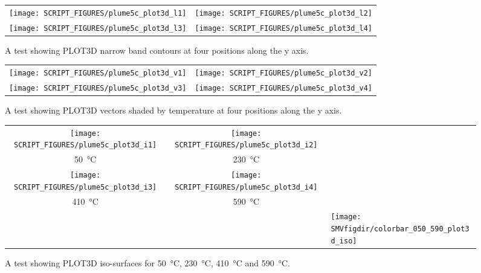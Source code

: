 \documentclass[11pt,twoside]{book}
\begin{document}
\begin{figure}[bph]
\begin{center}
\begin{tabular}{cc}
 \texttt{[image: SCRIPT\_FIGURES/plume5c\_plot3d\_l1]}&
 \texttt{[image: SCRIPT\_FIGURES/plume5c\_plot3d\_l2]}\\
 \texttt{[image: SCRIPT\_FIGURES/plume5c\_plot3d\_l3]}&
 \texttt{[image: SCRIPT\_FIGURES/plume5c\_plot3d\_l4]}\\
 \end{tabular}
\end{center}
 \caption{A test showing PLOT3D narrow band contours at four positions along the y axis.}
\label{figPLOT3Dtestline}%
\end{figure}

\begin{figure}[bph]
\begin{center}
\begin{tabular}{cc}
 \texttt{[image: SCRIPT\_FIGURES/plume5c\_plot3d\_v1]}&
 \texttt{[image: SCRIPT\_FIGURES/plume5c\_plot3d\_v2]}\\
 \texttt{[image: SCRIPT\_FIGURES/plume5c\_plot3d\_v3]}&
 \texttt{[image: SCRIPT\_FIGURES/plume5c\_plot3d\_v4]}\\
 \end{tabular}
\end{center}
 \caption{A test showing PLOT3D vectors shaded by temperature at four positions
 along the y axis.}
\label{figPLOT3Dtestvector}%
\end{figure}

\begin{figure}[bph]
\begin{center}
\begin{tabular}{ccl}
 \texttt{[image: SCRIPT\_FIGURES/plume5c\_plot3d\_i1]}&
 \texttt{[image: SCRIPT\_FIGURES/plume5c\_plot3d\_i2]}\\
 \SI{50}{\degreeCelsius}&\SI{230}{\degreeCelsius}\\
  \texttt{[image: SCRIPT\_FIGURES/plume5c\_plot3d\_i3]}&
 \texttt{[image: SCRIPT\_FIGURES/plume5c\_plot3d\_i4]}\\
 \SI{410}{\degreeCelsius}&\SI{590}{\degreeCelsius}\\
&&\raisebox{0.5in}[0pt]{\texttt{[image: \\SMVfigdir/colorbar\_050\_590\_plot3d\_iso]}}\\
 \end{tabular}
\end{center}
 \caption{A test showing PLOT3D iso-surfaces for \SI{50}{\degreeCelsius},
 \SI{230}{\degreeCelsius}, \SI{410}{\degreeCelsius} and \SI{590}{\degreeCelsius}.}
\label{figPLOT3Dtestiso}%
\end{figure}
\end{document}
